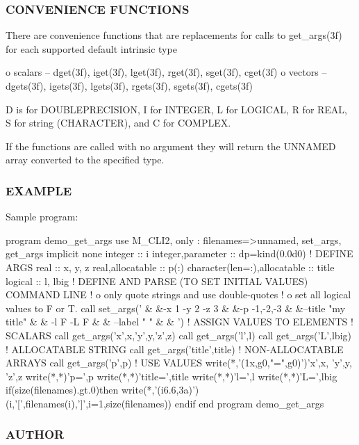 \subsubsection*{C\+O\+N\+V\+E\+N\+I\+E\+N\+CE F\+U\+N\+C\+T\+I\+O\+NS}

\begin{DoxyVerb}There are convenience functions that are replacements for calls to
get_args(3f) for each supported default intrinsic type

  o scalars -- dget(3f), iget(3f), lget(3f), rget(3f), sget(3f),
               cget(3f)
  o vectors -- dgets(3f), igets(3f), lgets(3f), rgets(3f),
               sgets(3f), cgets(3f)

D is for DOUBLEPRECISION, I for INTEGER, L for LOGICAL, R for REAL,
S for string (CHARACTER), and C for COMPLEX.

If the functions are called with no argument they will return the
UNNAMED array converted to the specified type.
\end{DoxyVerb}


\subsubsection*{E\+X\+A\+M\+P\+LE}

Sample program\+: \begin{DoxyVerb}program demo_get_args
use M_CLI2,  only : filenames=>unnamed, set_args, get_args
implicit none
integer                      :: i
integer,parameter            :: dp=kind(0.0d0)
! DEFINE ARGS
real                         :: x, y, z
real,allocatable             :: p(:)
character(len=:),allocatable :: title
logical                      :: l, lbig
! DEFINE AND PARSE (TO SET INITIAL VALUES) COMMAND LINE
!   o only quote strings and use double-quotes
!   o set all logical values to F or T.
call set_args(' &
   &-x 1 -y 2 -z 3 &
   &-p -1,-2,-3 &
   &--title "my title" &
   & -l F -L F  &
   & --label " " &
   & ')
! ASSIGN VALUES TO ELEMENTS
! SCALARS
call get_args('x',x,'y',y,'z',z)
call get_args('l',l)
call get_args('L',lbig)
! ALLOCATABLE STRING
call get_args('title',title)
! NON-ALLOCATABLE ARRAYS
call get_args('p',p)
! USE VALUES
write(*,'(1x,g0,"=",g0)')'x',x, 'y',y, 'z',z
write(*,*)'p=',p
write(*,*)'title=',title
write(*,*)'l=',l
write(*,*)'L=',lbig
if(size(filenames).gt.0)then
   write(*,'(i6.6,3a)')(i,'[',filenames(i),']',i=1,size(filenames))
endif
end program demo_get_args
\end{DoxyVerb}
 \subsubsection*{A\+U\+T\+H\+OR}

